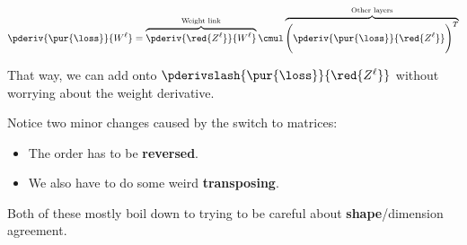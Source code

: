         \begin{equation*}
            \pderiv {\pur{\loss}} {W^\ell} 
            =
            \overbrace{
                \pderiv {\red{Z^\ell}}   {W^{\ell}}
            }^{\text{Weight link}} 
                \cmul
            \overbrace{
                \Bigg(
                    \pderiv {\pur{\loss}} {\red{Z^\ell}}
                \Bigg)^T
            }^{\text{Other layers}}
        \end{equation*}
        
        That way, we can add onto $\pderivslash {\pur{\loss}} {\red{Z^\ell}}$ without worrying about the weight derivative.
            
        Notice two minor changes caused by the switch to matrices:
        
        \begin{itemize}
            \item The order has to be \textbf{reversed}.
            \item We also have to do some weird \textbf{transposing}.
        \end{itemize}
        
        Both of these mostly boil down to trying to be careful about \textbf{shape}/dimension agreement.
            \\
        
